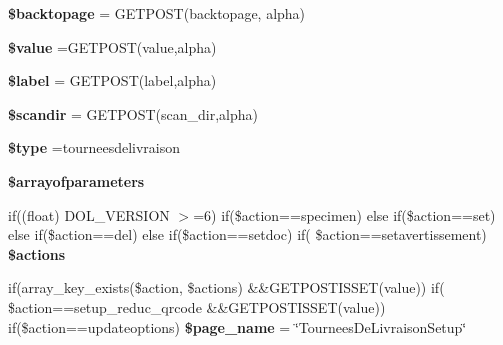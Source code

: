 \begin{DoxyCompactItemize}
\item 
\mbox{\label{setup_8php_a71552e61097747f0d8e8288daf9be44d}} 
{\bfseries \$backtopage} = G\+E\+T\+P\+O\+ST(\textquotesingle{}backtopage\textquotesingle{}, \textquotesingle{}alpha\textquotesingle{})
\item 
\mbox{\label{setup_8php_a0f298096f322952a72a50f98a74c7b60}} 
{\bfseries \$value} =G\+E\+T\+P\+O\+ST(\textquotesingle{}value\textquotesingle{},\textquotesingle{}alpha\textquotesingle{})
\item 
\mbox{\label{setup_8php_a177af2bf70bede02de3d05a425fb8e43}} 
{\bfseries \$label} = G\+E\+T\+P\+O\+ST(\textquotesingle{}label\textquotesingle{},\textquotesingle{}alpha\textquotesingle{})
\item 
\mbox{\label{setup_8php_af8740e47a115ee055d40254054b37978}} 
{\bfseries \$scandir} = G\+E\+T\+P\+O\+ST(\textquotesingle{}scan\+\_\+dir\textquotesingle{},\textquotesingle{}alpha\textquotesingle{})
\item 
\mbox{\label{setup_8php_ac4d4c56358032c00065202143a3b7a85}} 
{\bfseries \$type} =\textquotesingle{}tourneesdelivraison\textquotesingle{}
\item 
{\bfseries \$arrayofparameters}
\item 
if((float) D\+O\+L\+\_\+\+V\+E\+R\+S\+I\+ON $>$=6) if(\$action==\textquotesingle{}specimen\textquotesingle{}) else if(\$action==\textquotesingle{}set\textquotesingle{}) else if(\$action==\textquotesingle{}del\textquotesingle{}) else if(\$action==\textquotesingle{}setdoc\textquotesingle{}) if( \$action==\textquotesingle{}setavertissement\textquotesingle{}) {\bfseries \$actions}
\item 
\mbox{\label{setup_8php_a87a7c946a6ea036f23049b1a981c35ae}} 
if(array\+\_\+key\+\_\+exists(\$action, \$actions) \&\&G\+E\+T\+P\+O\+S\+T\+I\+S\+S\+ET(\textquotesingle{}value\textquotesingle{})) if( \$action==\textquotesingle{}setup\+\_\+reduc\+\_\+qrcode\textquotesingle{} \&\&G\+E\+T\+P\+O\+S\+T\+I\+S\+S\+ET(\textquotesingle{}value\textquotesingle{})) if(\$action==\textquotesingle{}updateoptions\textquotesingle{}) {\bfseries \$page\+\_\+name} = \char`\"{}Tournees\+De\+Livraison\+Setup\char`\"{}
\item 
\mbox{\label{setup_8php_aa8a538bac04922850b15c7460fb1bfc7}} 

\end{DoxyCompactItemize}
